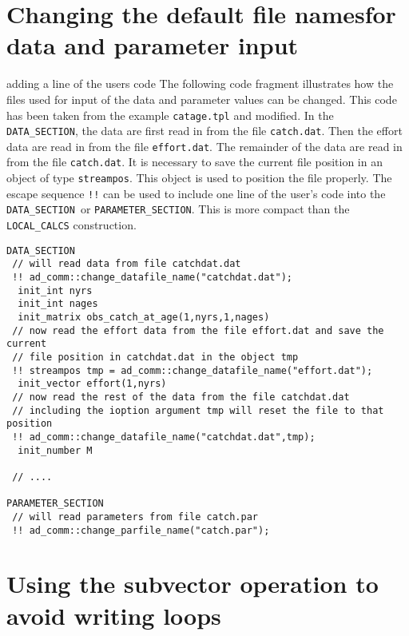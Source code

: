 \documentclass{admbmanual}
\newcommand\DS{\texttt{DATA\_SECTION}}
\newcommand\PS{\texttt{PARAMETER\_SECTION}}
\begin{document}
\section{Changing the default file names\br for data and parameter input}

 {adding a line of the users code}
The following code fragment illustrates how the files used for input of the data
and parameter values can be changed. This code has been taken from the example
\texttt{catage.tpl} and modified. In the \DS, the data are first read in from
the file \texttt{catch.dat}. Then the effort data are read in from the file
\texttt{effort.dat}. The remainder of the data are read in from the file
\texttt{catch.dat}. It is necessary to save the current file position in an
object of type \texttt{streampos}. This object is used to position the file
properly. The escape sequence {\tt!!} can be used to include one line of the
user's code into the \DS\ or \PS. This is more compact than the
\texttt{LOCAL\_CALCS} construction.
\begin{lstlisting}
DATA_SECTION
 // will read data from file catchdat.dat
 !! ad_comm::change_datafile_name("catchdat.dat");
  init_int nyrs
  init_int nages
  init_matrix obs_catch_at_age(1,nyrs,1,nages)
 // now read the effort data from the file effort.dat and save the current
 // file position in catchdat.dat in the object tmp
 !! streampos tmp = ad_comm::change_datafile_name("effort.dat");
  init_vector effort(1,nyrs)
 // now read the rest of the data from the file catchdat.dat
 // including the ioption argument tmp will reset the file to that position
 !! ad_comm::change_datafile_name("catchdat.dat",tmp);
  init_number M

 // ....

PARAMETER_SECTION
 // will read parameters from file catch.par
 !! ad_comm::change_parfile_name("catch.par");
\end{lstlisting}

\section{Using the subvector operation to avoid writing loops}
\end{document}
